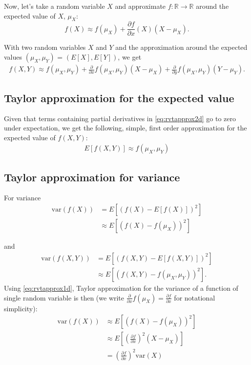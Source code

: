 \documentclass{article}
\begin{document}
Now, let's take a random variable $X$ and approximate $f: \mathbb{R} \rightarrow \mathbb{R}$ around the expected value of $X$, $\mu_X$:
\begin{equation}
    f(X) \approx f(\mu_X) + \frac{\partial f}{\partial x}(X)(X-\mu_X) \label{eq:rvtapprox1d}.
\end{equation}

With two random variables $X$ and $Y$ and the approximation around the expected values $(\mu_X, \mu_Y)$ = $(E[X], E[Y])$, we get
\begin{align}
    f(X, Y) \approx f(\mu_X, \mu_Y) + \frac{\partial }{\partial x} f(\mu_X, \mu_Y) (X - \mu_X) + \frac{\partial }{\partial y} f(\mu_X, \mu_Y) (Y - \mu_Y) \label{eq:rvtapprox2d}.
\end{align}

\subsection{Taylor approximation for the expected value}
Given that terms containing partial derivatives in \eqref{eq:rvtapprox2d} go to zero under expectation, we get the following, simple, first order approximation for the expected value of $f(X, Y)$:
\begin{align}
    E[f(X, Y)] \approx f(\mu_X, \mu_Y) \label{eapprox}
\end{align}

\subsection{Taylor approximation for variance}
For variance
\begin{align}
    \text{var}(f(X)) &= E\left[ \left(f(X) - E[f(X)] \right)^2 \right] \nonumber \\
    &\approx E\left[ \left( f(X) - f(\mu_X) \right)^2 \right] \nonumber
\end{align}

and
\begin{align}
    \text{var}(f(X, Y)) &= E\left[ \left(f(X, Y) - E[f(X,Y)] \right)^2 \right] \nonumber \\
    &\approx E\left[ \left( f(X, Y) - f(\mu_X, \mu_Y) \right)^2 \right] \nonumber.
\end{align}
Using \eqref{eq:rvtapprox1d}, Taylor approximation for the variance of a function of single random variable is then (we write $\frac{\partial }{\partial x} f(\mu_X) = \frac{\partial f}{\partial x}$ for notational simplicity):
\begin{align}
    \text{var}(f(X)) &\approx E\left[ \left( f(X) - f(\mu_X) \right)^2 \right] \nonumber \\
    &\approx E\left[ \left( \frac{\partial f}{\partial x} \right)^2 (X - \mu_X) \right] \nonumber \\
    &= \left( \frac{\partial f}{\partial x} \right)^2 \text{var}(X) \label{eq:varapprox1d}
\end{align}
\end{document}
